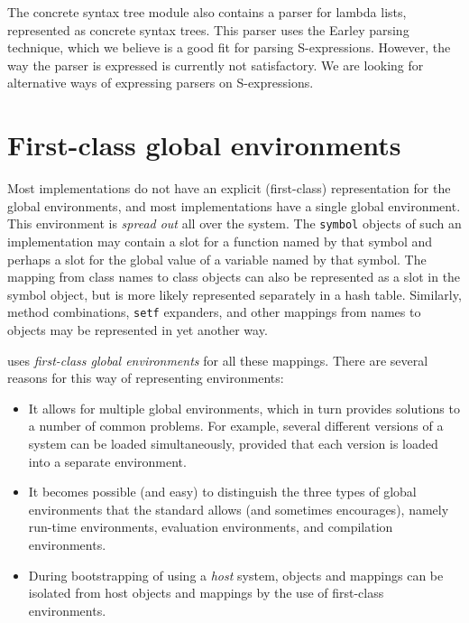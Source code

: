 The concrete syntax tree module also contains a parser for lambda
lists, represented as concrete syntax trees.  This parser uses the
Earley parsing technique, which we believe is a good fit for parsing
S-expressions.  However, the way the parser is expressed is currently
not satisfactory.  We are looking for alternative ways of expressing
parsers on S-expressions.

\section{First-class global environments}
\label{sec-first-class-global-environments}

Most \commonlisp{} implementations do not have an explicit
(first-class) representation for the global environments, and most
\commonlisp{} implementations have a single global environment.  This
environment is \emph{spread out} all over the system.  The
\texttt{symbol} objects of such an implementation may contain a slot
for a function named by that symbol and perhaps a slot for the global
value of a variable named by that symbol.  The mapping from class
names to class objects can also be represented as a slot in the symbol
object, but is more likely represented separately in a hash table.
Similarly, method combinations, \texttt{setf} expanders, and other
mappings from names to objects may be represented in yet another way.

\sysname{} uses \emph{first-class global environments} for all these
mappings.  There are several reasons for this way of representing
environments:

\begin{itemize}
\item It allows for multiple global environments, which in turn
  provides solutions to a number of common problems.  For example,
  several different versions of a system can be loaded simultaneously,
  provided that each version is loaded into a separate environment.
\item It becomes possible (and easy) to distinguish the three types of
  global environments that the \commonlisp{} standard allows (and
  sometimes encourages), namely run-time environments, evaluation
  environments, and compilation environments.
\item During bootstrapping of \sysname{} using a \emph{host}
  \commonlisp{} system, \sysname{} objects and mappings can be
  isolated from host objects and mappings by the use of first-class
  environments.
\end{itemize}

